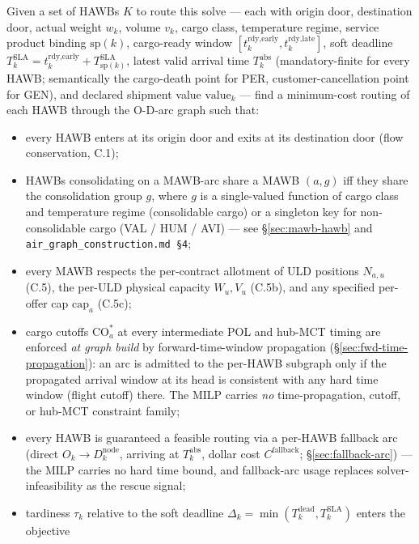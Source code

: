 \documentclass[11pt,a4paper]{article}
\theoremstyle{definition}
\begin{document}
Given a set of HAWBs $K$ to route this solve --- each with origin door, destination
door, actual weight $w_k$, volume $v_k$, cargo class,
temperature regime, service product binding $\text{sp}(k)$, cargo-ready window
$[t_k^{\text{rdy,early}}, t_k^{\text{rdy,late}}]$, soft deadline $T_k^{\text{SLA}}
= t_k^{\text{rdy,early}} + T^{\text{SLA}}_{\text{sp}(k)}$, latest valid arrival
time $T_k^{\text{abs}}$ (mandatory-finite for every HAWB; semantically the
cargo-death point for PER, customer-cancellation point for GEN), and declared
shipment value $\text{value}_k$ --- find a minimum-cost routing of each HAWB
through the O-D-arc graph such that:
\begin{itemize}[noitemsep]
  \item every HAWB enters at its origin door and exits at its destination door
        (flow conservation, C.1);
  \item HAWBs consolidating on a MAWB-arc share a MAWB $(a, g)$ iff they share
        the consolidation group $g$, where $g$ is a single-valued function of
        cargo class and temperature regime (consolidable cargo) or a singleton
        key for non-consolidable cargo (VAL / HUM / AVI) --- see
        \S\ref{sec:mawb-hawb} and \texttt{air\_graph\_construction.md \S4};
  \item every MAWB respects the per-contract allotment of ULD positions
        $N_{a,u}$ (C.5), the per-ULD physical capacity $W_u, V_u$ (C.5b), and
        any specified per-offer cap $\text{cap}_a$ (C.5c);
  \item cargo cutoffs $\text{CO}_a^*$ at every intermediate POL and hub-MCT
        timing are enforced \emph{at graph build} by forward-time-window
        propagation (\S\ref{sec:fwd-time-propagation}): an arc is admitted to
        the per-HAWB subgraph only if the propagated arrival window at its
        head is consistent with any hard time window (flight cutoff) there.
        The MILP carries \emph{no} time-propagation, cutoff, or hub-MCT
        constraint family;
  \item every HAWB is guaranteed a feasible routing via a per-HAWB fallback
        arc (direct $O_k \to D_k^{\text{node}}$, arriving at $T_k^{\text{abs}}$,
        dollar cost $C^{\text{fallback}}$; \S\ref{sec:fallback-arc}) --- the
        MILP carries no hard time bound, and fallback-arc usage replaces
        solver-infeasibility as the rescue signal;
  \item tardiness $\tau_k$ relative to the soft deadline $\Delta_k =
        \min(T_k^{\text{dead}}, T_k^{\text{SLA}})$ enters the objective

\end{itemize}
\end{document}
